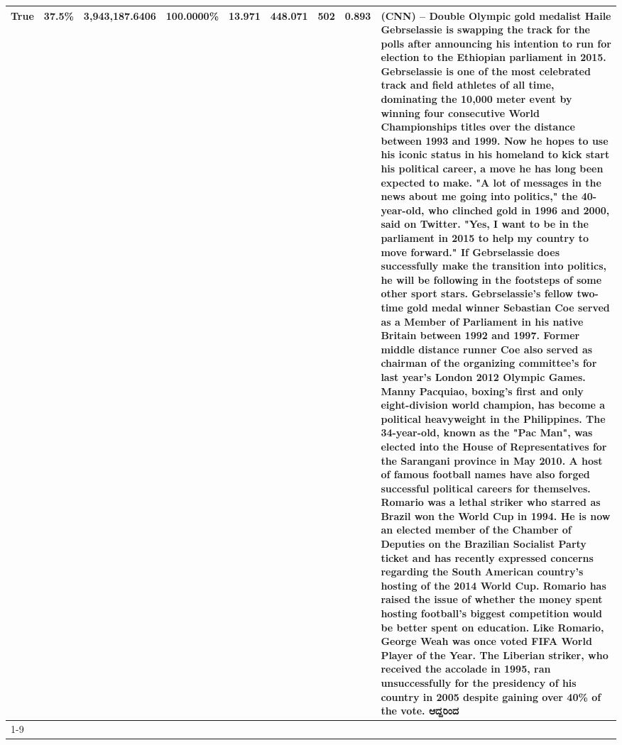 \begin{table}[H]
{\begin{tabular}{lllrlllll}
True & 37.5\% & 3,943,187.6406 & \bfseries \color{red} 100.0000\% & 13.971 & 448.071 & 502 & 0.893 & (CNN) -- Double Olympic gold medalist Haile Gebrselassie is swapping the track for the polls after announcing his intention to run for election to the Ethiopian parliament in 2015. Gebrselassie is one of the most celebrated track and field athletes of all time, dominating the 10,000 meter event by winning four consecutive World Championships titles over the distance between 1993 and 1999. Now he hopes to use his iconic status in his homeland to kick start his political career, a move he has long been expected to make. "A lot of messages in the news about me going into politics," the 40-year-old, who clinched gold in 1996 and 2000, said on Twitter. "Yes, I want to be in the parliament in 2015 to help my country to move forward." If Gebrselassie does successfully make the transition into politics, he will be following in the footsteps of some other sport stars. Gebrselassie's fellow two-time gold medal winner Sebastian Coe served as a Member of Parliament in his native Britain between 1992 and 1997. Former middle distance runner Coe also served as chairman of the organizing committee's for last year's London 2012 Olympic Games. Manny Pacquiao, boxing's first and only eight-division world champion, has become a political heavyweight in the Philippines. The 34-year-old, known as the "Pac Man", was elected into the House of Representatives for the Sarangani province in May 2010. A host of famous football names have also forged successful political careers for themselves. Romario was a lethal striker who starred as Brazil won the World Cup in 1994. He is now an elected member of the Chamber of Deputies on the Brazilian Socialist Party ticket and has recently expressed concerns regarding the South American country's hosting of the 2014 World Cup. Romario has raised the issue of whether the money spent hosting football's biggest competition would be better spent on education. Like Romario, George Weah was once voted FIFA World Player of the Year. The Liberian striker, who received the accolade in 1995, ran unsuccessfully for the presidency of his country in 2005 despite gaining over 40\% of the vote. ಆದ್ದರಿಂದ \\
\cline{1-9}

\end{tabular}}
\end{table}
